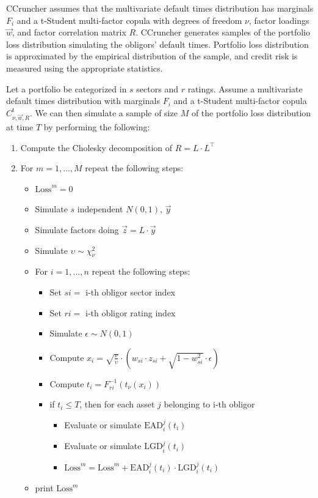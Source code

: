\documentclass[11pt,fleqn]{book} %
\begin{document}
CCruncher assumes that the multivariate default times distribution has
marginals $F_i$ and a t-Student multi-factor copula with degrees 
of freedom $\nu$, factor loadings $\vec{w}$, and factor correlation matrix 
$R$. CCruncher generates samples of the portfolio loss distribution simulating 
the obligors' default times. Portfolio loss distribution is approximated by the 
empirical distribution of the sample, and credit risk is measured using the 
appropriate statistics.

\begin{algorithm}
	\label{alg:pldmc}
	Let a portfolio be categorized in $s$ sectors and $r$ ratings.
	Assume a multivariate default times distribution with marginals $F_i$
	and a t-Student multi-factor copula $C_{\nu,\vec{w},R}^{\text{t}}$.
	We can then simulate a sample of size $M$ of the portfolio loss distribution
	at time $T$ by performing the following:
	\begin{enumerate}
		\item Compute the Cholesky decomposition of $R = L \cdot L^\intercal$
		\item For $m=1,\dots,M$ repeat the following steps:
		\begin{itemize}
			\item $\text{Loss}^m = 0$
			\item Simulate $s$ independent $N(0,1)$, $\vec{y}$
			\item Simulate factors doing $\vec{z} = L \cdot \vec{y}$
			\item Simulate $\upsilon \sim \chi_{\nu}^2$
			\item For $i=1,\dots,n$ repeat the following steps:
			\begin{itemize}
				\item Set $si = $ i-th obligor sector index
				\item Set $ri = $ i-th obligor rating index
				\item Simulate $\epsilon \sim N(0,1)$
				\item Compute $x_i = \sqrt{\frac{\nu}{\upsilon}} \cdot \left( w_{si} \cdot z_{si} + \sqrt{1-w_{si}^2} \cdot \epsilon \right)$
				\item Compute $t_i = F_{ri}^{-1}\left(t_{\nu}(x_i)\right)$
				\item if $t_i \le T$, then for each asset $j$ belonging to i-th obligor
				\begin{itemize}
					\item Evaluate or simulate $\text{EAD}_i^j(t_i)$
					\item Evaluate or simulate $\text{LGD}_i^j(t_i)$
					\item $\text{Loss}^m = \text{Loss}^m + \text{EAD}_i^j(t_i) \cdot \text{LGD}_i^j(t_i)$
				\end{itemize}
			\end{itemize}
			\item print $\text{Loss}^m$
		\end{itemize}
	\end{enumerate}
\end{algorithm}
\end{document}

